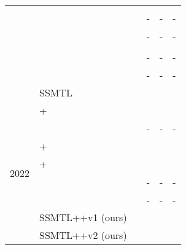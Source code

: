 \documentclass[times,twocolumn,final,authoryear]{elsarticle}
\begin{document}
\begin{table*}[!th]
\begin{center}
\begin{tabular}{|c|l|c|c|c|c|}
&\cite{Georgescu-TPAMI-2021} &  &  &  &  \\  
&\cite{Madan-ICCVW-2021} &  & - & - &  - \\  
&\cite{Li-CVIU-2021} &  & - & - & - \\ 
&\cite{Liu-ICCV-2021} &  &  &  &  \\
&\cite{Yang-Access-2021} &  & - & - & - \\
&\cite{Yu-TNNLS-2021} &  & -  & -  & - \\
\cline{2-6}
& SSMTL \citep{Georgescu-CVPR-2021} &  &   &   &  \\
\hline 
\multirow{8}{*}{{2022}}
& \cite{Georgescu-TPAMI-2021}+\cite{Ristea-CVPR-2022} &  &  &  &  \\
& \cite{Lin-AAAI-2022} &  & - & - & - \\
& \cite{Liu-CVPR-2018} + \cite{Ristea-CVPR-2022} &  &  &  &  \\
& \cite{Liu-ICCV-2021} + \cite{Ristea-CVPR-2022} &  &  &  &  \\
& \cite{Park-WACV-2022} &  & - & - & - \\
& \cite{Yu-CVPR-2022} &  & - & - & - \\
\cline{2-6}
& SSMTL++v1 (ours) &  &  &  &  \\
& SSMTL++v2 (ours) &  &  &  &  \\
\hline
\end{tabular}
\end{center}
\end{table*}
\end{document}
